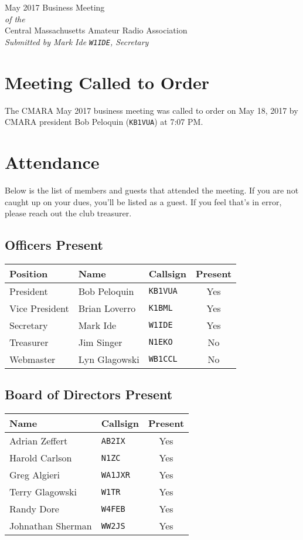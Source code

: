 \documentclass[10pt,letterpaper]{article}
\begin{document}
\begin{center}
{\huge May 2017 Business Meeting}\\
\emph{of the}\\
{\Large Central Massachusetts Amateur Radio Association}\\
\emph{Submitted by Mark Ide \texttt{W1IDE}, Secretary}
\end{center}

\section{Meeting Called to Order}
The CMARA May 2017 business meeting was called to order on May 18, 2017 by CMARA president Bob Peloquin (\texttt{KB1VUA}) at 7:07 PM.

\section{Attendance}
\noindent
Below is the list of members and guests that attended the meeting. If you are not caught up on your dues, you'll be listed as a guest. If you feel that's in error, please reach out the club treasurer.

\subsection{Officers Present}
\begin{tabular}{|l|l|l|c|}
  \hline
  \textbf{Position} & \textbf{Name}  & \textbf{Callsign} & \textbf{Present} \\ \hline
  President         & Bob Peloquin   & \texttt{KB1VUA}   & Yes \\
  Vice President    & Brian Loverro  & \texttt{K1BML}    & Yes \\
  Secretary         & Mark Ide       & \texttt{W1IDE}    & Yes \\
  Treasurer         & Jim Singer     & \texttt{N1EKO}    & No \\
  Webmaster         & Lyn Glagowski  & \texttt{WB1CCL}   & No \\
  \hline
\end{tabular}

\subsection{Board of Directors Present}
\begin{tabular}{|l|l|c|}
  \hline
  \textbf{Name}     & \textbf{Callsign} & \textbf{Present} \\ \hline
  Adrian Zeffert    & \texttt{AB2IX}    & Yes \\
  Harold Carlson    & \texttt{N1ZC}     & Yes \\
  Greg Algieri      & \texttt{WA1JXR}   & Yes \\
  Terry Glagowski   & \texttt{W1TR}     & Yes \\
  Randy Dore        & \texttt{W4FEB}    & Yes \\
  Johnathan Sherman & \texttt{WW2JS}    & Yes \\
  \hline
\end{tabular}
\end{document}

